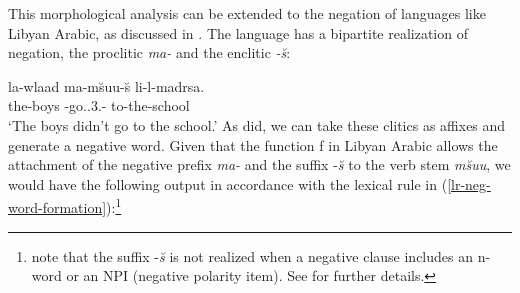 \documentclass[output=paper
	        ,collection
	        ,collectionchapter
 	        ,biblatex
                ,babelshorthands
                ,newtxmath
                ,draftmode
                ,colorlinks, citecolor=brown
]{langscibook}
\begin{document}
\begin{exe}
\begin{xlist}
\begin{exe}
\begin{xlist}
This morphological analysis can be extended to the negation of languages
like Libyan Arabic, as discussed in \citet{BK:12}. The language
has a bipartite realization of negation, the proclitic \emph{ma-} and the enclitic \emph{-\u{s}}:

\ea
\gll la-wlaad ma-m\u{s}uu-\u{s} li-l-madrsa. \\
     the-boys \NEG-go.\pst.3.\pl-\NEG{} to-the-school\\
\glt `The boys didn't go to the school.'
\z
%
As \citet{BK:12} did, we can take these clitics as affixes and generate
a negative word. Given that the function
f in Libyan Arabic allows the attachment of the negative prefix
\textit{ma-} and the suffix -\textit{\u{s}} to the verb
stem \emph{m\u{s}uu}, we would have the following output in accordance
with the lexical rule in (\ref{lr-neg-word-formation}):\footnote{%
   \citet{BK:12} note that the suffix -\textit{\u{s}} is not realized when a negative clause
   includes an n-word or an NPI (negative polarity item). See \citet{BK:12} for further details.}
%
%


\ea
\z

\end{xlist}
\end{exe}
\end{xlist}
\end{exe}
\end{document}
